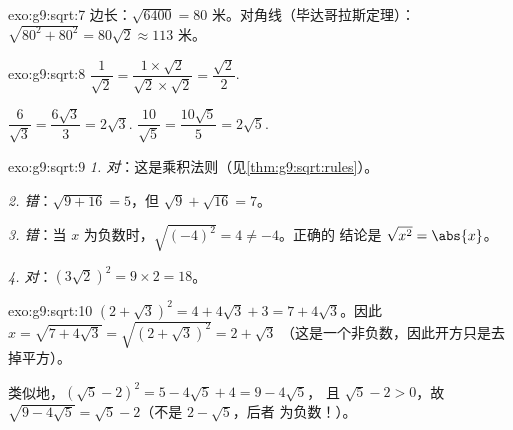 \begin{solution}{exo:g9:sqrt:7}
边长：$\sqrt{6400} = 80$ 米。对角线（毕达哥拉斯定理）：
$\sqrt{80^2 + 80^2} = 80\sqrt2 \approx 113$ 米。
\end{solution}

\begin{solution}{exo:g9:sqrt:8}
$\dfrac{1}{\sqrt2} = \dfrac{1 \times \sqrt2}{\sqrt2 \times \sqrt2}
= \dfrac{\sqrt2}{2}$.

$\dfrac{6}{\sqrt3} = \dfrac{6\sqrt3}{3} = 2\sqrt3$.
\quad
$\dfrac{10}{\sqrt5} = \dfrac{10\sqrt5}{5} = 2\sqrt5$.
\end{solution}

\begin{solution}{exo:g9:sqrt:9}
\emph{1. 对}：这是乘积法则（见\cref{thm:g9:sqrt:rules}）。

\emph{2. 错}：$\sqrt{9 + 16} = 5$，但 $\sqrt9 + \sqrt{16} = 7$。

\emph{3. 错}：当 $x$ 为负数时，$\sqrt{(-4)^2} = 4 \neq -4$。正确的
结论是 $\sqrt{x^2} = \abs{x}$。

\emph{4. 对}：$\left(3\sqrt2\right)^2 = 9 \times 2 = 18$。
\end{solution}

\begin{solution}{exo:g9:sqrt:10}
$\left(2 + \sqrt3\right)^2 = 4 + 4\sqrt3 + 3 = 7 + 4\sqrt3$。因此
$x = \sqrt{7 + 4\sqrt3} = \sqrt{\left(2+\sqrt3\right)^2} = 2 + \sqrt3$
（这是一个非负数，因此开方只是去掉平方）。

类似地，$\left(\sqrt5 - 2\right)^2 = 5 - 4\sqrt5 + 4 = 9 - 4\sqrt5$，
且 $\sqrt5 - 2 > 0$，故
$\sqrt{9 - 4\sqrt5} = \sqrt5 - 2$（不是 $2 - \sqrt5$，后者
为负数！）。
\end{solution}

